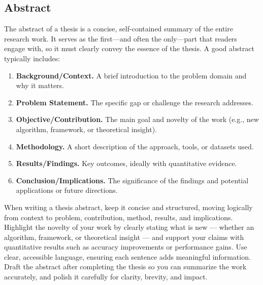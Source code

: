 \documentclass[PCOM,Thesis,Review]{mpThesis}
\newcommand{\Hd}[1]{{\color{SteelBlue}\bf#1.}}
\begin{document}
\begin{FrontMatter}[FigLs=true,TabLs=true,AlgoLs=false,AbbreLs=true]


\chapter{Abstract}

\begin{Remark}
The abstract of a thesis is a concise, self-contained summary of the entire research work.
It serves as the first—and often the only—part that readers engage with, so it must clearly convey the essence of the thesis.
A good abstract typically includes:
\begin{enumerate}
\item \Hd{Background/Context}
A brief introduction to the problem domain and why it matters.

\item \Hd{Problem Statement}
The specific gap or challenge the research addresses.

\item \Hd{Objective/Contribution}
The main goal and novelty of the work (e.g., new algorithm, framework, or theoretical insight).

\item \Hd{Methodology}
A short description of the approach, tools, or datasets used.

\item \Hd{Results/Findings}
Key outcomes, ideally with quantitative evidence.

\item \Hd{Conclusion/Implications}
The significance of the findings and potential applications or future directions.
\end{enumerate}
When writing a thesis abstract, keep it concise and structured, moving logically from context to problem, contribution, method, results, and implications.
Highlight the novelty of your work by clearly stating what is new --- whether an algorithm, framework, or theoretical insight ---
and support your claims with quantitative results such as accuracy improvements or performance gains.
Use clear, accessible language, ensuring each sentence adds meaningful information.
Draft the abstract after completing the thesis so you can summarize the work accurately, and polish it carefully for clarity, brevity, and impact.
\end{Remark}

\Keywords{\InsertThesisKeywords}


\end{FrontMatter}
\end{document}

